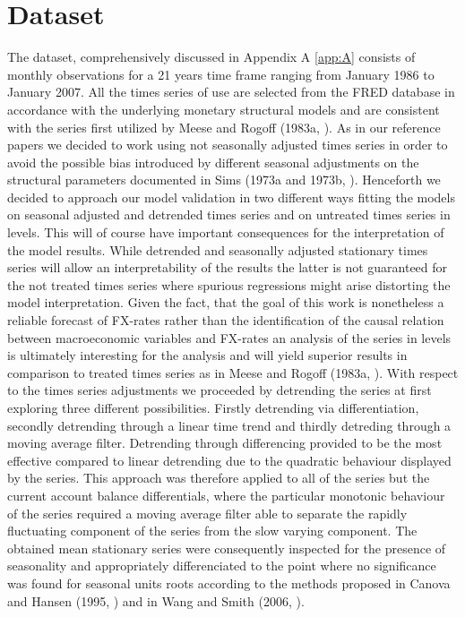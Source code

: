 \section{Dataset}
\label{sec:part1}

The dataset, comprehensively discussed in Appendix A \ref{app:A} consists of
monthly observations for a 21 years time frame ranging
from January 1986 to January 2007.
All the times series of use are selected from the FRED database
in accordance with the underlying monetary
structural models and are consistent with the series first utilized by
Meese and Rogoff (1983a, \cite{MeeseRogoffa}).
As in our reference papers we decided to work using not seasonally
adjusted times series in order to avoid the possible bias introduced by different seasonal
adjustments on the structural parameters documented in Sims (1973a and 1973b, \cite{Simsa, Simsb}).
Henceforth we decided to approach our model validation in two different ways fitting the models
on seasonal adjusted and detrended times series and on untreated times series in levels.
This will of course have important consequences for the interpretation of the model results.
While detrended and seasonally adjusted stationary times series will allow an interpretability
of the results the latter is not guaranteed for the not treated times series where spurious regressions
might arise distorting the model interpretation. Given the fact, that the goal of this work
is nonetheless a reliable forecast of FX-rates rather than the identification of the causal
relation between macroeconomic variables and FX-rates an analysis of the series in levels is
ultimately interesting for the analysis and will yield superior results in comparison to treated times
series as in Meese and Rogoff (1983a, \cite{MeeseRogoffa}).
With respect to the times series adjustments we proceeded by detrending the series at first exploring three
different possibilities. Firstly detrending via differentiation, secondly detrending through a
linear time trend and thirdly detreding through a moving average filter. Detrending through differencing
provided to be the most effective compared to linear detrending due to the quadratic behaviour displayed by
the series. This approach was therefore applied to all of the series but the current account balance
differentials, where the particular monotonic behaviour of the series required a moving average
filter able to separate the rapidly fluctuating component of the series from the slow varying component.
The obtained mean stationary series were consequently inspected for the presence of seasonality and appropriately
differenciated to the point where no significance was found for seasonal units roots according to the methods
proposed in Canova and Hansen (1995, \cite{CanovaHansen}) and in Wang and Smith (2006, \cite{WangSmith}).